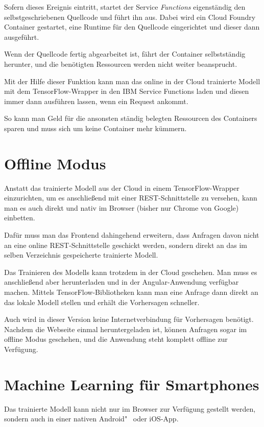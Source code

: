 Sofern dieses Ereignis eintritt, startet der Service \textit{Functions} eigenständig den selbstgeschriebenen Quellcode
und führt ihn aus. Dabei wird ein Cloud Foundry Container gestartet, eine Runtime für den Quellcode eingerichtet und
dieser dann ausgeführt.

Wenn der Quellcode fertig abgearbeitet ist, fährt der Container selbstständig herunter, und die benötigten Ressourcen
werden nicht weiter beansprucht.

Mit der Hilfe dieser Funktion kann man das online in der Cloud trainierte Modell mit dem TensorFlow-Wrapper in den IBM
Service Functions laden und diesen immer dann ausführen lassen, wenn ein Request ankommt.

So kann man Geld für die ansonsten ständig belegten Ressourcen des Containers sparen und muss sich um keine Container
mehr kümmern.

\section{Offline Modus}
Anstatt das trainierte Modell aus der Cloud in einem TensorFlow-Wrapper einzurichten, um es anschließend mit einer
REST-Schnittstelle zu versehen, kann man es auch direkt und nativ im Browser (bisher nur Chrome von Google) einbetten.

Dafür muss man das Frontend dahingehend erweitern, dass Anfragen davon nicht an eine online REST-Schnittstelle geschickt
werden, sondern direkt an das im selben Verzeichnis gespeicherte trainierte Modell.

Das Trainieren des Modells kann trotzdem in der Cloud geschehen. Man muss es anschließend aber herunterladen und in der
Angular-Anwendung verfügbar machen. Mittels TensorFlow-Bibliotheken kann man eine Anfrage dann direkt an das lokale
Modell stellen und erhält die Vorhersagen schneller.

Auch wird in dieser Version keine Internetverbindung für Vorhersagen benötigt. Nachdem die Webseite einmal
heruntergeladen ist, können Anfragen sogar im offline Modus geschehen, und die Anwendung steht komplett offline zur
Verfügung.

\section{Machine Learning für Smartphones}
Das trainierte Modell kann nicht nur im Browser zur Verfügung gestellt werden, sondern auch in einer nativen
Android"~ oder iOS-App.

